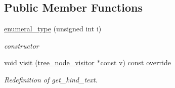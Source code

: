 \subsection*{Public Member Functions}
\begin{DoxyCompactItemize}
\item 
\hyperlink{structenumeral__type_a5ee660323814a50840634379df3f318f}{enumeral\+\_\+type} (unsigned int i)
\begin{DoxyCompactList}\small\item\em constructor \end{DoxyCompactList}\item 
void \hyperlink{structenumeral__type_ab9c53d590b11d386a0791a0b211a5b1f}{visit} (\hyperlink{classtree__node__visitor}{tree\+\_\+node\+\_\+visitor} $\ast$const v) const override
\begin{DoxyCompactList}\small\item\em Redefinition of get\+\_\+kind\+\_\+text. \end{DoxyCompactList}\end{DoxyCompactItemize}
